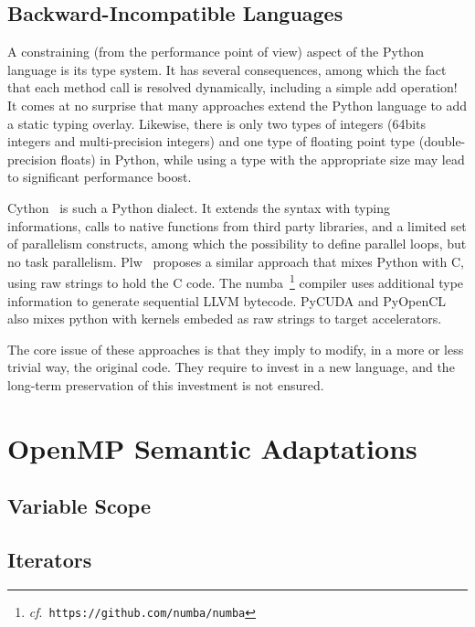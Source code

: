 \documentclass{llncs}
\begin{document}
\subsection{Backward-Incompatible Languages}

A constraining (from the performance point of view) aspect of the Python
language is its type system. It has several consequences, among which the fact
that each method call is resolved dynamically, including a simple add
operation! It comes at no surprise that many approaches extend the Python
language to add a static typing overlay. Likewise, there is only two types of
integers (64bits integers and multi-precision integers) and one type of floating
point type (double-precision floats) in Python, while using a type with the
appropriate size may lead to significant performance boost.

Cython~\cite{cython2010} is such a Python dialect. It extends the syntax with
typing informations, calls to native functions from third party libraries, and a
limited set of parallelism constructs, among which the possibility to define
parallel loops, but no task parallelism. Plw~\cite{dongara2007} proposes a
similar approach that mixes Python with C, using raw strings to hold the C code.
The numba~\footnote{\emph{cf}.\ \texttt{https://github.com/numba/numba}}
compiler uses additional type information to generate sequential LLVM bytecode.
PyCUDA and PyOpenCL~\cite{klockner2012} also mixes python with kernels
embeded as raw strings to target accelerators.

The core issue of these approaches is that they imply to modify, in a more or
less trivial way, the original code. They require to invest in a new language,
and the long-term preservation of this investment is not ensured.

\section{OpenMP Semantic Adaptations}\label{sec:python-openmp}

\subsection{Variable Scope}

\subsection{Iterators}
\end{document}
